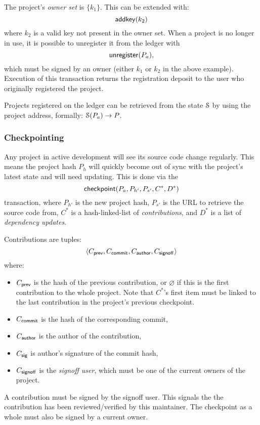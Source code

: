 The project's \emph{owner set} is $\{k_1\}$. This can be extended with:
\[
    \mathsf{addkey}\small{\lparen k_2\rparen}
\]
where $k_2$ is a valid key not present in the owner set.
When a project is no longer in use, it is possible to unregister it from the
ledger with
\[
    \mathsf{unregister}\small{\lparen P_a\rparen},
\]
which must be signed by an owner (either $k_1$ or $k_2$ in the above example).
Execution of this transaction returns the registration deposit to the user who
originally registered the project.

Projects registered on the ledger can be retrieved from the state $\mathcal{S}$ by
using the project address, formally: $\mathcal{S}(P_a) \to P$.

\subsubsection{Checkpointing} Any project in active development will see its
source code change regularly. This means the project hash $P_h$ will quickly
become out of sync with the project's latest state and will need updating. This
is done via the
\[
    \mathsf{checkpoint}\small{\lparen P_a, P_{h'}, P_{s'}, C^*, D^*\rparen}
\]
transaction, where $P_{h'}$ is the new project hash, $P_{s'}$ is the URL to
retrieve the source code from, $C^*$ is a hash-linked-list of
\emph{contributions}, and $D^*$ is a list of \emph{dependency updates}.

Contributions are tuples:
\[
   \langle C_{\mathsf{prev}}, C_{\mathsf{commit}}, C_{\mathsf{author}}, C_{\mathsf{signoff}}\rangle
\]
where:
\begin{itemize}
\item $C_{\mathsf{prev}}$ is the hash of the previous contribution, or
  $\varnothing$ if this is the first contribution to the whole
  project. Note that $C^*$'s first item must be linked to the last
  contribution in the project's previous checkpoint.
\item $C_{\mathsf{commit}}$ is the hash of the corresponding commit,
\item $C_{\mathsf{author}}$ is the author of the contribution,
\item $C_{\mathsf{sig}}$ is author's signature of the commit hash,
\item $C_{\mathsf{signoff}}$ is the \emph{signoff user}, which must be
  one of the current owners of the project.
\end{itemize}
A contribution must be signed by the signoff user. This signals the
the contribution has been reviewed/verified by this maintainer. The
checkpoint as a whole must also be signed by a current owner.

